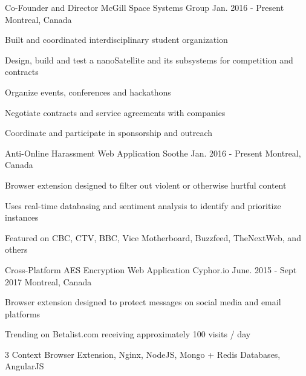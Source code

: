 

\begin{cventries}

  \cventry
    {Co-Founder and Director} %
    {McGill Space Systems Group} %
    {Jan. 2016 - Present} %
    {Montreal, Canada} %
    {
      \begin{cvitems} %
        \item{ Built and coordinated interdisciplinary student organization }
        \item{ Design, build and test a nanoSatellite and its subsystems for competition and contracts }
        \item{ Organize events, conferences and hackathons }
        \item{ Negotiate contracts and service agreements with companies }
        \item{ Coordinate and participate in sponsorship and outreach }
      \end{cvitems}
    }
    
  \cventry
    {Anti-Online Harassment Web Application} %
    {Soothe} %
    {Jan. 2016 - Present} %
    {Montreal, Canada} %
    {
      \begin{cvitems} %
        \item{ Browser extension designed to filter out violent or otherwise hurtful content }
        \item{ Uses real-time databasing and sentiment analysis to identify and prioritize instances }
        \item{ Featured on CBC, CTV, BBC, Vice Motherboard, Buzzfeed, TheNextWeb, and others }
      \end{cvitems}
    }
 
 \cventry
    {Cross-Platform AES Encryption Web Application} %
    {Cyphor.io} %
    {June. 2015 - Sept 2017} %
    {Montreal, Canada} %
    {
      \begin{cvitems} %
        \item{ Browser extension designed to protect messages on social media and email platforms }
        \item{ Trending on Betalist.com receiving approximately 100 visits / day }
        \item{ 3 Context Browser Extension, Nginx, NodeJS, Mongo + Redis Databases, AngularJS }
      \end{cvitems}
    }

\end{cventries}
